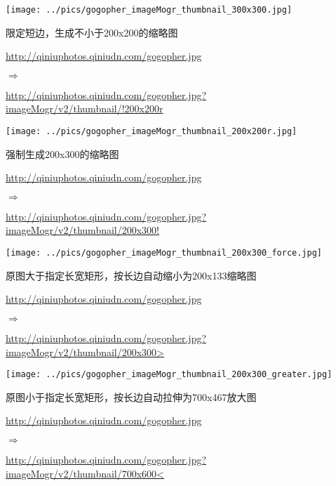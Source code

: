 \documentclass[11pt, oneside]{book}
\newcommand{\qpar}[1]{
\vspace{0.25em}
\noindent
#1\par
\vspace{0.25em}
}
\newcommand{\qurl}[1]{\url{#1}}
\begin{document}
\begin{CJK*}{UTF8}{song}
\begin{sample}
    \begin{center}
      \texttt{[image: ../pics/gogopher\_imageMogr\_thumbnail\_300x300.jpg]}
    \end{center}
  \label{imageMogr-thumbnail-300x300}
\end{sample}

\begin{sample}
  \caption{限定短边，生成不小于200x200的缩略图}
    \qpar{\qurl{http://qiniuphotos.qiniudn.com/gogopher.jpg}}
    \qpar{$\Rightarrow$}
    \qpar{\qurl{http://qiniuphotos.qiniudn.com/gogopher.jpg?imageMogr/v2/thumbnail/!200x200r}}

    \begin{center}
      \texttt{[image: ../pics/gogopher\_imageMogr\_thumbnail\_200x200r.jpg]}
    \end{center}
  \label{imageMogr-thumbnail-200x200r}
\end{sample}

\begin{sample}
  \caption{强制生成200x300的缩略图}
    \qpar{\qurl{http://qiniuphotos.qiniudn.com/gogopher.jpg}}
    \qpar{$\Rightarrow$}
    \qpar{\qurl{http://qiniuphotos.qiniudn.com/gogopher.jpg?imageMogr/v2/thumbnail/200x300!}}

    \begin{center}
      \texttt{[image: ../pics/gogopher\_imageMogr\_thumbnail\_200x300\_force.jpg]}
    \end{center}
  \label{imageMogr-thumbnail-200x300-force}
\end{sample}

\begin{sample}
  \caption{原图大于指定长宽矩形，按长边自动缩小为200x133缩略图}
    \qpar{\qurl{http://qiniuphotos.qiniudn.com/gogopher.jpg}}
    \qpar{$\Rightarrow$}
    \qpar{\qurl{http://qiniuphotos.qiniudn.com/gogopher.jpg?imageMogr/v2/thumbnail/200x300>}}

    \begin{center}
      \texttt{[image: ../pics/gogopher\_imageMogr\_thumbnail\_200x300\_greater.jpg]}
    \end{center}
  \label{imageMogr-thumbnail-200x300-greater}
\end{sample}

\begin{sample}
  \caption{原图小于指定长宽矩形，按长边自动拉伸为700x467放大图}
    \qpar{\qurl{http://qiniuphotos.qiniudn.com/gogopher.jpg}}
    \qpar{$\Rightarrow$}
    \qpar{\qurl{http://qiniuphotos.qiniudn.com/gogopher.jpg?imageMogr/v2/thumbnail/700x600<}}


\end{sample}
\end{CJK*}
\end{document}
